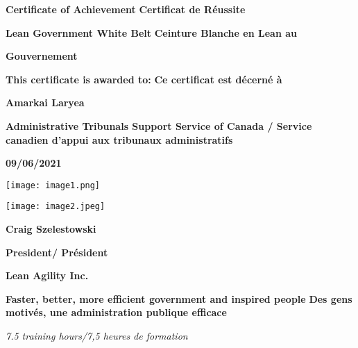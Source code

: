 \documentclass{article}
\begin{document}
\begin{landscape}
\thispagestyle{empty}

\Huge\textbf{Certificate of Achievement}
\hfill\textbf{Certificat de Réussite}

\vspace{0.4in}

\LARGE\textbf{Lean Government White Belt}
\hfill\textbf{Ceinture Blanche en Lean au}

\vspace{0.2in}

\hfill\textbf{Gouvernement}

\vspace{0.5in}

\normalsize\textbf{This certificate is awarded to:}
\hfill\textbf{Ce certificat est décerné à}

\vspace{0.08in}

\center\huge\textbf{Amarkai Laryea}

\vspace{0.25in}

\large\textbf{Administrative Tribunals Support Service of Canada / Service canadien d'appui aux tribunaux administratifs}

\vspace{\baselineskip}

\large\textbf{09/06/2021}

\vspace{\baselineskip}

\texttt{[image: image1.png]}

\vspace{\baselineskip}

\texttt{[image: image2.jpeg]}

\vspace{\baselineskip}

\textbf{Craig Szelestowski}

\textbf{President/ Président}

\textbf{Lean Agility Inc.}

\vspace{\baselineskip}

\flushleft\small\textbf{Faster, better, more efficient government and inspired people}
\hfill\textbf{Des gens motivés, une administration publique efficace}

\vspace{0.3in}

\center\small\emph{7.5 training hours/7,5 heures de formation}

\end{landscape}
\end{document}
